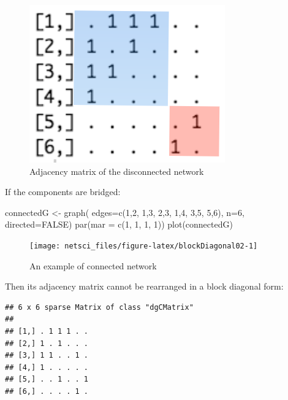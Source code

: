 \documentclass[
]{krantz}
\makeatletter
\newenvironment{Shaded}{\begin{snugshade}}{\end{snugshade}}
\newcommand{\AttributeTok}[1]{\textcolor[rgb]{0.61,0.61,0.61}{#1}}
\newcommand{\ConstantTok}[1]{\textcolor[rgb]{0,0,0}{#1}}
\newcommand{\DecValTok}[1]{\textcolor[rgb]{0.06,0.06,0.06}{#1}}
\newcommand{\FunctionTok}[1]{\textcolor[rgb]{0,0,0}{#1}}
\newcommand{\NormalTok}[1]{#1}
\newcommand{\OtherTok}[1]{\textcolor[rgb]{0.37,0.37,0.37}{#1}}
\newenvironment{kframe}{%
\medskip{}
\setlength{\fboxsep}{.8em}
 \def\at@end@of@kframe{}%
 \ifinner\ifhmode%
  \def\at@end@of@kframe{\end{minipage}}%
  \begin{minipage}{\columnwidth}%
 \fi\fi%
 \def\FrameCommand##1{\hskip\@totalleftmargin \hskip-\fboxsep
 \colorbox{shadecolor}{##1}\hskip-\fboxsep
     \hskip-\linewidth \hskip-\@totalleftmargin \hskip\columnwidth}%
 \MakeFramed {\advance\hsize-\width
   \@totalleftmargin\z@ \linewidth\hsize
   \@setminipage}}%
 {\par\unskip\endMakeFramed%
 \at@end@of@kframe}
\renewenvironment{Shaded}{\begin{kframe}}{\end{kframe}}
\makeatother
\begin{document}
\begin{figure}

{\centering \includegraphics[width=0.45\linewidth]{images/blockDiagonal} 

}

\caption{Adjacency matrix of the disconnected network}\label{fig:BDmatrix}
\end{figure}

If the components are bridged:

\begin{Shaded}
\begin{Highlighting}[]
\NormalTok{connectedG }\OtherTok{\textless{}{-}} \FunctionTok{graph}\NormalTok{( }\AttributeTok{edges=}\FunctionTok{c}\NormalTok{(}\DecValTok{1}\NormalTok{,}\DecValTok{2}\NormalTok{, }\DecValTok{1}\NormalTok{,}\DecValTok{3}\NormalTok{, }\DecValTok{2}\NormalTok{,}\DecValTok{3}\NormalTok{, }\DecValTok{1}\NormalTok{,}\DecValTok{4}\NormalTok{, }\DecValTok{3}\NormalTok{,}\DecValTok{5}\NormalTok{, }\DecValTok{5}\NormalTok{,}\DecValTok{6}\NormalTok{), }\AttributeTok{n=}\DecValTok{6}\NormalTok{, }
                     \AttributeTok{directed=}\ConstantTok{FALSE}\NormalTok{)}
\FunctionTok{par}\NormalTok{(}\AttributeTok{mar =} \FunctionTok{c}\NormalTok{(}\DecValTok{1}\NormalTok{, }\DecValTok{1}\NormalTok{, }\DecValTok{1}\NormalTok{, }\DecValTok{1}\NormalTok{))}
\FunctionTok{plot}\NormalTok{(connectedG)}
\end{Highlighting}
\end{Shaded}

\begin{figure}

{\centering \texttt{[image: netsci\_files/figure-latex/blockDiagonal02-1]} 

}

\caption{An example of connected network}\label{fig:blockDiagonal02}
\end{figure}

Then its adjacency matrix cannot be rearranged in a block diagonal form:

\begin{verbatim}
## 6 x 6 sparse Matrix of class "dgCMatrix"
##                 
## [1,] . 1 1 1 . .
## [2,] 1 . 1 . . .
## [3,] 1 1 . . 1 .
## [4,] 1 . . . . .
## [5,] . . 1 . . 1
## [6,] . . . . 1 .
\end{verbatim}
\end{document}
